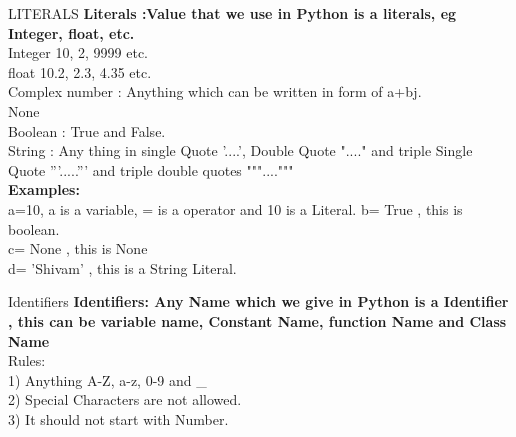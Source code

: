 \documentclass[aspectratio=169, 10pt]{beamer}
\begin{document}
\begin{frame}[t]{LITERALS}
\textbf{Literals :Value that we use in Python is a literals, eg Integer, float, etc.}\\
\vspace{0.5 cm}
Integer 10, 2, 9999 etc.\\
float 10.2, 2.3, 4.35 etc.\\
Complex number : Anything which can be written in form of a+bj.\\
None \\
Boolean : True and False.\\
String : Any thing in single Quote '....', Double Quote "...." and triple Single Quote '''.....''' and triple double quotes """...."""\\
\vspace{0.5 cm}
\textbf{Examples:}\\
a=10, a is a variable, = is a operator and 10 is a Literal.
b= True , this is boolean.\\
c= None , this is None\\
d= 'Shivam' , this is a String Literal.\\ 
\end{frame}

\begin{frame}[t]{Identifiers}
\textbf{Identifiers: Any Name which we give in Python is a Identifier , this can be variable name, Constant Name, function Name and Class Name}\\
\vspace{0.5 cm}
Rules:\\
1) Anything A-Z, a-z, 0-9 and \_\\
2) Special Characters are not allowed.\\
3) It should not start with Number.\\ 
\end{frame}
\end{document}
